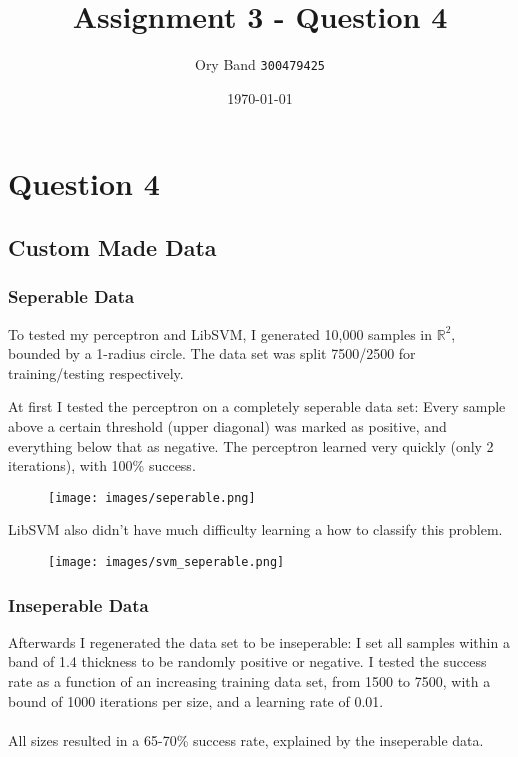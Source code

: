\documentclass[a4paper]{article}
\title{Assignment 3 - Question 4}
\author{Ory Band \texttt{300479425}}
\date{\today}
\begin{document}
\maketitle
\newpage

\section {Question 4}

\subsection {Custom Made Data}

\subsubsection {Seperable Data}

To tested my perceptron and LibSVM,
I generated 10,000 samples in $\mathbb{R}^2$, bounded by a 1-radius circle.
The data set was split 7500/2500 for training/testing respectively.

At first I tested the perceptron on a completely seperable data set:
Every sample above a certain threshold (upper diagonal) was marked as positive,
and everything below that as negative.
The perceptron learned very quickly (only 2 iterations), with 100\% success.

\begin{figure}[h!]
    \texttt{[image: images/seperable.png]}
\end{figure}

LibSVM also didn't have much difficulty learning a how to classify this problem.

\begin{figure}[h!]
    \texttt{[image: images/svm\_seperable.png]}
\end{figure}

\newpage

\subsubsection {Inseperable Data}

Afterwards I regenerated the data set to be inseperable:
I set all samples within a band of 1.4 thickness to be randomly positive
or negative. I tested the success rate as a function of an increasing training
data set, from 1500 to 7500, with a bound of 1000 iterations per size,
and a learning rate of 0.01.
\\\\
All sizes resulted in a 65-70\% success rate, explained by the inseperable data.
\end{document}
